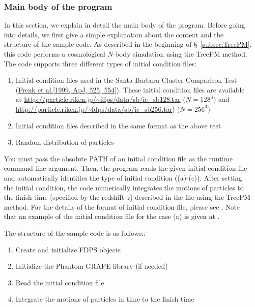 \subsubsection{Main body of the program}
In this section, we explain in detail the main body of the program. Before going into details, we first give a simple explanation about the content and the structure of the sample code. As described in the beginning of \S~\ref{subsec:TreePM}, this code performs a cosmological $N$-body simulation using the TreePM method. The code supports three different types of initial condition files:
\begin{enumerate}[leftmargin=*,itemsep=-1ex,label=(\alph*)]
\item Initial condition files used in the Santa Barbara Cluster
  Comparison Test
  (\href{http://iopscience.iop.org/article/10.1086/307908/meta}{Frenk
    et al.[1999, ApJ, 525, 554]}). These initial condition files are
  available at 
  \href{http://particle.riken.jp/~fdps/data/sb/ic_sb128.tar}{http://particle.riken.jp{\slash}\~{}fdps{\slash}data{\slash}sb{\slash}ic\_sb128.tar} ($N=128^3$) and
  \href{http://particle.riken.jp/~fdps/data/sb/ic_sb256.tar}{http://particle.riken.jp{\slash}\~{}fdps{\slash}data{\slash}sb{\slash}ic\_sb256.tar}) ($N=256^3$)
\item Initial condition files described in the same format as the above test
\item Random distribution of particles
\end{enumerate}
You must pass the absolute PATH of an initial condition file as the runtime command-line argument. Then, the program reads the given initial condition file and automatically identifies the type of initial condition ((a)-(c)). After setting the initial condition, the code numerically integrates the motions of particles to the finish time (specified by the redshift $z$) described in the file using the TreePM method. For the details of the format of initial condition file, please see . Note that an example of the initial condition file for the case (a) is given at .

The structure of the sample code is as follows::
\begin{enumerate}[leftmargin=*,itemsep=-1ex,label=(\arabic*)]
\item Create and initialize FDPS objects
\item Initialize the Phantom-GRAPE library (if needed)
\item Read the initial condition file 
\item Integrate the motions of particles in time to the finish time
\end{enumerate}

